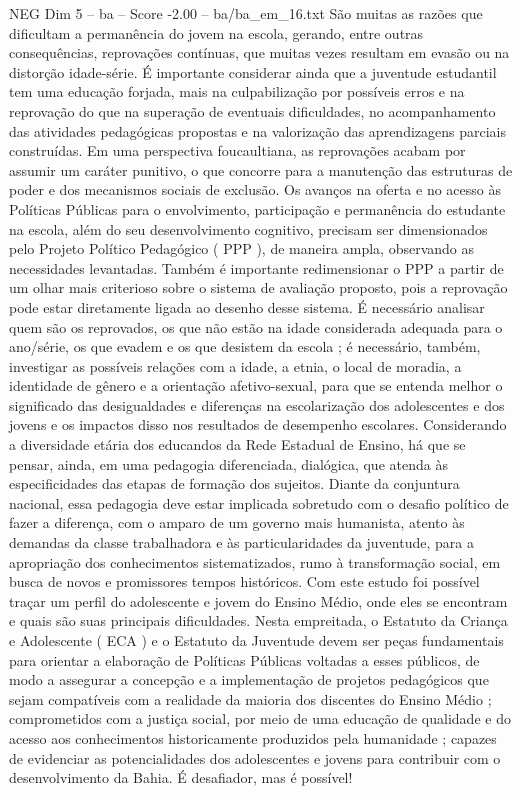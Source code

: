 \begin{textsample}{NEG Dim 5 – ba – Score -2.00 – ba/ba\_em\_16.txt}
São muitas as razões que dificultam a permanência do jovem na escola, gerando, entre outras consequências, reprovações contínuas, que muitas vezes resultam em evasão ou na distorção idade-série.
É importante considerar ainda que a juventude estudantil tem uma educação forjada, mais na culpabilização por possíveis erros e na reprovação do que na superação de eventuais dificuldades, no acompanhamento das atividades pedagógicas propostas e na valorização das aprendizagens parciais construídas.
Em uma perspectiva foucaultiana, as reprovações acabam por assumir um caráter punitivo, o que concorre para a manutenção das estruturas de poder e dos mecanismos sociais de exclusão.
Os avanços na oferta e no acesso às Políticas Públicas para o envolvimento, participação e permanência do estudante na escola, além do seu desenvolvimento cognitivo, precisam ser dimensionados pelo Projeto Político Pedagógico ( PPP ), de maneira ampla, observando as necessidades levantadas.
Também é importante redimensionar o PPP a partir de um olhar mais criterioso sobre o sistema de avaliação proposto, pois a reprovação pode estar diretamente ligada ao desenho desse sistema.
É necessário analisar quem são os reprovados, os que não estão na idade considerada adequada para o ano/série, os que evadem e os que desistem da escola ; é necessário, também, investigar as possíveis relações com a idade, a etnia, o local de moradia, a identidade de gênero e a orientação afetivo-sexual, para que se entenda melhor o significado das desigualdades e diferenças na escolarização dos adolescentes e dos jovens e os impactos disso nos resultados de desempenho escolares.
Considerando a diversidade etária dos educandos da Rede Estadual de Ensino, há que se pensar, ainda, em uma pedagogia diferenciada, dialógica, que atenda às especificidades das etapas de formação dos sujeitos.
Diante da conjuntura nacional, essa pedagogia deve estar implicada sobretudo com o desafio político de fazer a diferença, com o amparo de um governo mais humanista, atento às demandas da classe trabalhadora e às particularidades da juventude, para a apropriação dos conhecimentos sistematizados, rumo à transformação social, em busca de novos e promissores tempos históricos.
Com este estudo foi possível traçar um perfil do adolescente e jovem do Ensino Médio, onde eles se encontram e quais são suas principais dificuldades.
Nesta empreitada, o Estatuto da Criança e Adolescente ( ECA ) e o Estatuto da Juventude devem ser peças fundamentais para orientar a elaboração de Políticas Públicas voltadas a esses públicos, de modo a assegurar a concepção e a implementação de projetos pedagógicos que sejam compatíveis com a realidade da maioria dos discentes do Ensino Médio ; comprometidos com a justiça social, por meio de uma educação de qualidade e do acesso aos conhecimentos historicamente produzidos pela humanidade ; capazes de evidenciar as potencialidades dos adolescentes e jovens para contribuir com o desenvolvimento da Bahia.
É desafiador, mas é possível!

\end{textsample}
